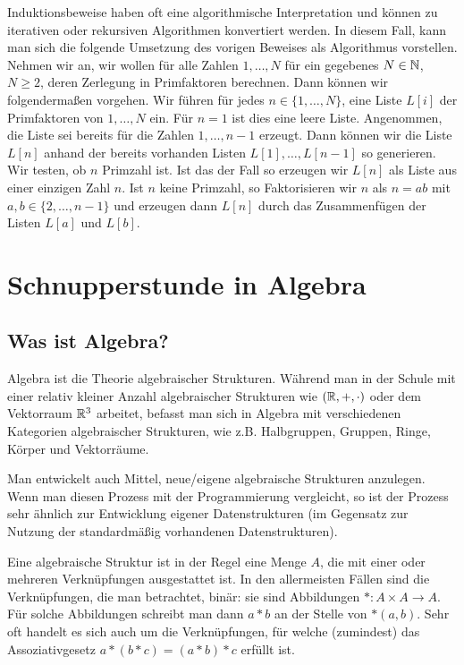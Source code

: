\begin{bem}
	Induktionsbeweise haben oft eine algorithmische Interpretation und können zu iterativen oder rekursiven Algorithmen konvertiert werden. In diesem Fall, kann man sich die folgende Umsetzung des vorigen Beweises als Algorithmus vorstellen. Nehmen wir an, wir wollen für alle Zahlen $1,\ldots,N$ für ein gegebenes $N \in \mathbb{N}$, $N \ge 2$, deren Zerlegung in Primfaktoren berechnen. Dann können wir folgendermaßen vorgehen. Wir führen für jedes $n \in \{1,\ldots,N\}$, eine Liste $L[i]$ der Primfaktoren von $1,\ldots,N$ ein. Für $n=1$ ist dies eine leere Liste. Angenommen, die Liste sei bereits für die Zahlen $1,\ldots,n-1$ erzeugt. Dann können wir die Liste $L[n]$ anhand der bereits vorhanden Listen $L[1],\ldots,L[n-1]$ so generieren. Wir testen, ob $n$ Primzahl ist. Ist das der Fall so erzeugen wir $L[n]$ als Liste aus einer einzigen Zahl $n$. Ist $n$ keine Primzahl, so Faktorisieren wir $n$ als $n = ab$ mit $a,b \in \{2,\ldots,n-1\}$ und erzeugen dann $L[n]$ durch das Zusammenfügen der Listen $L[a]$ und $L[b]$. 
\end{bem} 

\section{Schnupperstunde in Algebra} 

\subsection{Was ist Algebra?}

\begin{bem}
	Algebra ist die Theorie algebraischer Strukturen. Während man in der Schule mit einer relativ kleiner Anzahl algebraischer Strukturen wie $(\mathbb{R},+,\cdot)$ oder dem Vektorraum $\mathbb{R}^3$ arbeitet, befasst man sich in Algebra mit verschiedenen Kategorien algebraischer Strukturen, wie z.B. Halbgruppen, Gruppen, Ringe, Körper und Vektorräume. 

Man entwickelt auch Mittel,  neue/eigene algebraische Strukturen anzulegen. Wenn man diesen Prozess mit der Programmierung vergleicht, so ist der Prozess sehr ähnlich zur Entwicklung eigener Datenstrukturen (im Gegensatz zur Nutzung der standardmäßig vorhandenen Datenstrukturen). 
\end{bem} 

\begin{bem} 
	Eine algebraische Struktur ist in der Regel eine Menge $A$, die mit einer oder mehreren Verknüpfungen ausgestattet ist. In den allermeisten Fällen sind die Verknüpfungen, die man betrachtet, binär: sie sind Abbildungen $\ast : A \times A \rightarrow A$.  Für solche Abbildungen schreibt man dann $a \ast b$ an der Stelle von $\ast(a,b)$. Sehr oft handelt es sich auch um die Verknüpfungen, für welche (zumindest) das Assoziativgesetz $a \ast (b \ast c) = (a \ast b) \ast c$ erfüllt ist. 
\end{bem}	
	
